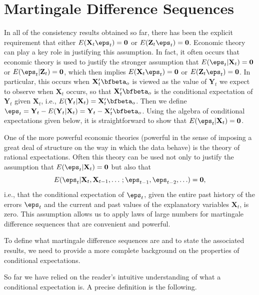 \section{Martingale Difference Sequences}\label{sec:lln-mds}

In all of the consistency results obtained so far, there has been the explicit requirement that either $E(\mathbf{X}_t \eps_t) = \mathbf{0}$ or $E(\mathbf{Z}_t \eps_t) = \mathbf{0}$. Economic theory can play a key role in justifying this assumption. In fact, it often occurs that economic theory is used to justify the stronger assumption that $E(\eps_t | \mathbf{X}_t) = \mathbf{0}$ or $E(\eps_t | \mathbf{Z}_t) = \mathbf{0}$, which then implies $E(\mathbf{X}_t \eps_t) = \mathbf{0}$ or $E(\mathbf{Z}_t \eps_t) = \mathbf{0}$. In particular, this occurs when $\mathbf{X}_t' \bfbeta_o$ is viewed as the value of $\mathbf{Y}_t$ we expect to observe when $\mathbf{X}_t$ occurs, so that $\mathbf{X}_t' \bfbeta_o$ is the conditional expectation of $\mathbf{Y}_t$ given $\mathbf{X}_t$, i.e., $E(\mathbf{Y}_t | \mathbf{X}_t) = \mathbf{X}_t' \bfbeta_o$. Then we define $\eps_t = \mathbf{Y}_t - E(\mathbf{Y}_t | \mathbf{X}_t) = \mathbf{Y}_t - \mathbf{X}_t' \bfbeta_o$. Using the algebra of conditional expectations given below, it is straightforward to show that $E(\eps_t | \mathbf{X}_t) = \mathbf{0}$.

One of the more powerful economic theories (powerful in the sense of imposing a great deal of structure on the way in which the data behave) is the theory of rational expectations. Often this theory can be used not only to justify the assumption that $E(\eps_t | \mathbf{X}_t) = \mathbf{0}$ but also that
\[
E(\eps_t | \mathbf{X}_t, \mathbf{X}_{t-1}, \ldots\,; \eps_{t-1}, \eps_{t-2}, \ldots) = \mathbf{0},
\]
i.e., that the conditional expectation of $\eps_t$, given the entire past history of the errors $\eps_t$ and the current and past values of the explanatory variables $\mathbf{X}_t$, is zero. This assumption allows us to apply laws of large numbers for martingale difference sequences that are convenient and powerful.

To define what martingale difference sequences are and to state the associated results, we need to provide a more complete background on the properties of conditional expectations.

So far we have relied on the reader's intuitive understanding of what a conditional expectation is. A precise definition is the following.

